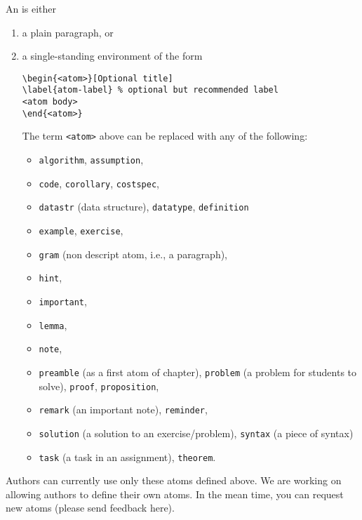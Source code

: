 \begin{definition}[Atom]
An  is either
\begin{enumerate}
\item a plain paragraph, or
\item a single-standing environment of the form

\begin{lstlisting}
\begin{<atom>}[Optional title]
\label{atom-label} % optional but recommended label
<atom body>
\end{<atom>}
\end{lstlisting}
%
The term \lstinline`<atom>` above can be replaced with any of the following:
\begin{itemize}
\item \lstinline`algorithm`, \lstinline`assumption`,
\item \lstinline`code`, \lstinline`corollary`, \lstinline`costspec`,
\item \lstinline`datastr` (data structure), \lstinline`datatype`, \lstinline`definition`
\item \lstinline`example`, \lstinline`exercise`,
\item \lstinline`gram`  (non descript atom, i.e., a paragraph),
\item \lstinline`hint`, 
\item \lstinline`important`, 
\item \lstinline`lemma`,
\item \lstinline`note`,
\item \lstinline`preamble` (as a  first atom of chapter), \lstinline`problem` (a problem for students to solve), \lstinline`proof`, \lstinline`proposition`,
\item \lstinline`remark` (an important note), \lstinline`reminder`,
\item \lstinline`solution` (a solution to an exercise/problem), \lstinline`syntax` (a piece of syntax)
\item \lstinline`task` (a task in an assignment), \lstinline`theorem`.
\end{itemize}
\end{enumerate}

\end{definition}

\begin{note}
Authors can currently use only these atoms defined above. We are working on allowing authors to define their own atoms.  
%
In the mean time, you can request new atoms  (please send feedback here).
\end{note}

